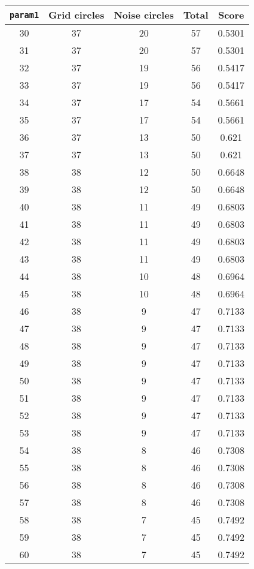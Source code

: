 \documentclass[letterpaper, 12pt]{article}
\begin{document}
\begin{longtable}{|c|c|c|c|c|}
\hline
\textbf{\texttt{param1}} & \textbf{Grid circles} & \textbf{Noise circles} & \textbf{Total} & \textbf{Score} \\
\hline
30 & 37 & 20 & 57 & 0.5301 \\
\hline
31 & 37 & 20 & 57 & 0.5301 \\
\hline
32 & 37 & 19 & 56 & 0.5417 \\
\hline
33 & 37 & 19 & 56 & 0.5417 \\
\hline
34 & 37 & 17 & 54 & 0.5661 \\
\hline
35 & 37 & 17 & 54 & 0.5661 \\
\hline
36 & 37 & 13 & 50 & 0.621 \\
\hline
37 & 37 & 13 & 50 & 0.621 \\
\hline
38 & 38 & 12 & 50 & 0.6648 \\
\hline
39 & 38 & 12 & 50 & 0.6648 \\
\hline
40 & 38 & 11 & 49 & 0.6803 \\
\hline
41 & 38 & 11 & 49 & 0.6803 \\
\hline
42 & 38 & 11 & 49 & 0.6803 \\
\hline
43 & 38 & 11 & 49 & 0.6803 \\
\hline
44 & 38 & 10 & 48 & 0.6964 \\
\hline
45 & 38 & 10 & 48 & 0.6964 \\
\hline
46 & 38 & 9 & 47 & 0.7133 \\
\hline
47 & 38 & 9 & 47 & 0.7133 \\
\hline
48 & 38 & 9 & 47 & 0.7133 \\
\hline
49 & 38 & 9 & 47 & 0.7133 \\
\hline
50 & 38 & 9 & 47 & 0.7133 \\
\hline
51 & 38 & 9 & 47 & 0.7133 \\
\hline
52 & 38 & 9 & 47 & 0.7133 \\
\hline
53 & 38 & 9 & 47 & 0.7133 \\
\hline
54 & 38 & 8 & 46 & 0.7308 \\
\hline
55 & 38 & 8 & 46 & 0.7308 \\
\hline
56 & 38 & 8 & 46 & 0.7308 \\
\hline
57 & 38 & 8 & 46 & 0.7308 \\
\hline
58 & 38 & 7 & 45 & 0.7492 \\
\hline
59 & 38 & 7 & 45 & 0.7492 \\
\hline
60 & 38 & 7 & 45 & 0.7492 \\
\hline

\end{longtable}
\end{document}
